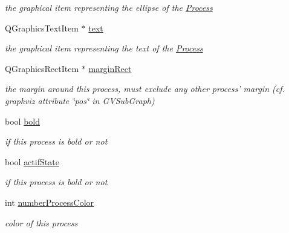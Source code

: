 \begin{DoxyCompactItemize}
\begin{DoxyCompactList}\small\item\em the graphical item representing the ellipse of the \hyperlink{classProcess}{Process} \end{DoxyCompactList}\item 
\hypertarget{classGProcess_a4ff36f4f6daae75d094c53d837ad4ecc}{Q\+Graphics\+Text\+Item $\ast$ \hyperlink{classGProcess_a4ff36f4f6daae75d094c53d837ad4ecc}{text}}\label{classGProcess_a4ff36f4f6daae75d094c53d837ad4ecc}

\begin{DoxyCompactList}\small\item\em the graphical item representing the text of the \hyperlink{classProcess}{Process} \end{DoxyCompactList}\item 
\hypertarget{classGProcess_a9488cf1e4bf4351233aaaa1c1bc67370}{Q\+Graphics\+Rect\+Item $\ast$ \hyperlink{classGProcess_a9488cf1e4bf4351233aaaa1c1bc67370}{margin\+Rect}}\label{classGProcess_a9488cf1e4bf4351233aaaa1c1bc67370}

\begin{DoxyCompactList}\small\item\em the margin around this process, must exclude any other process' margin (cf. graphviz attribute \char`\"{}pos\char`\"{} in G\+V\+Sub\+Graph) \end{DoxyCompactList}\item 
\hypertarget{classGProcess_ade5c867b8715449df4c2ae5a6393b0de}{bool \hyperlink{classGProcess_ade5c867b8715449df4c2ae5a6393b0de}{bold}}\label{classGProcess_ade5c867b8715449df4c2ae5a6393b0de}

\begin{DoxyCompactList}\small\item\em if this process is bold or not \end{DoxyCompactList}\item 
\hypertarget{classGProcess_abe553a88a9fabe701184d03abc4b9db7}{bool \hyperlink{classGProcess_abe553a88a9fabe701184d03abc4b9db7}{actif\+State}}\label{classGProcess_abe553a88a9fabe701184d03abc4b9db7}

\begin{DoxyCompactList}\small\item\em if this process is bold or not \end{DoxyCompactList}\item 
\hypertarget{classGProcess_af97beb415b929cde6cba174baa2e9b27}{int \hyperlink{classGProcess_af97beb415b929cde6cba174baa2e9b27}{number\+Process\+Color}}\label{classGProcess_af97beb415b929cde6cba174baa2e9b27}

\begin{DoxyCompactList}\small\item\em color of this process \end{DoxyCompactList}\end{DoxyCompactItemize}
